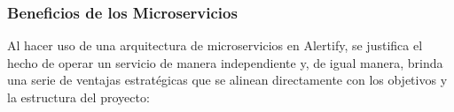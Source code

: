 
\subsubsection{Beneficios de los Microservicios}
Al hacer uso de una arquitectura de microservicios en Alertify, se justifica el hecho de operar un servicio de manera independiente y, de igual manera, brinda una serie de ventajas estratégicas que se alinean directamente con los objetivos y la estructura del proyecto:

